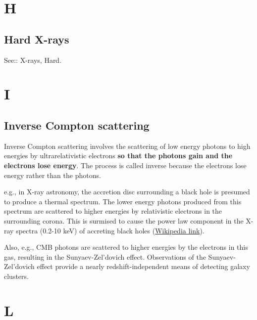 \documentclass[11pt]{article}
\begin{document}
\section*{H}
    \subsection*{Hard X-rays}
    See:: X-rays, Hard. 

\section*{I}
    \subsection*{Inverse Compton scattering}
    Inverse Compton scattering involves the scattering of low energy
    photons to high energies by ultrarelativistic electrons {\bf so that
      the photons gain and the electrons lose energy}. The process is called
    inverse because the electrons lose energy rather than the photons.

    e.g., in X-ray astronomy, the accretion disc surrounding a black
    hole is presumed to produce a thermal spectrum. The lower energy
    photons produced from this spectrum are scattered to higher energies
    by relativistic electrons in the surrounding corona. This is surmised
    to cause the power law component in the X-ray spectra (0.2-10 keV) of
    accreting black holes (\href{https://en.wikipedia.org/wiki/Compton\_scattering}{Wikipedia link}).

    Also, e.g., CMB photons are scattered to higher energies by the
    electrons in this gas, resulting in the Sunyaev-Zel'dovich
    effect. Observations of the Sunyaev-Zel'dovich effect provide a nearly
    redshift-independent means of detecting galaxy clusters.


\section*{L}
\end{document}
